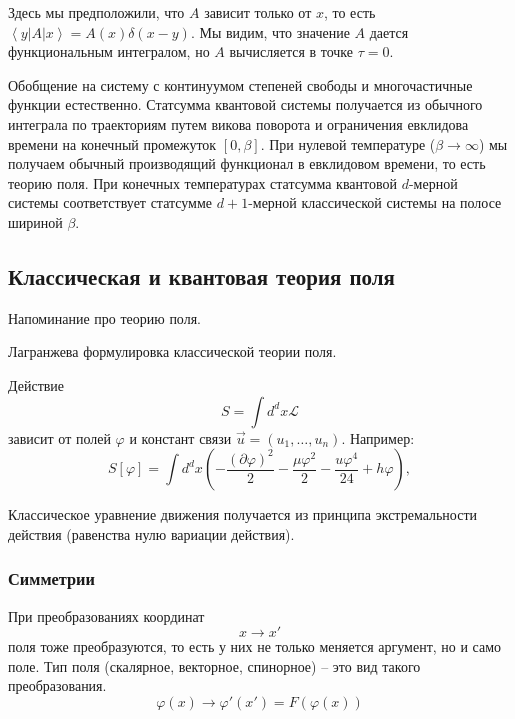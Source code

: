 \documentclass[a4paper,12pt]{article}
\theoremstyle{definition}
\theoremstyle{definition}
\theoremstyle{definition}
\begin{document}
Здесь мы предположили, что $A$ зависит только от $x$, то есть $\left<y\right|
A\left|x\right>=A(x)\delta(x-y)$. Мы видим, что значение $A$ дается функциональным интегралом, но
$A$ вычисляется в точке $\tau=0$.  

Обобщение на систему с континуумом степеней свободы и многочастичные функции естественно. Статсумма
квантовой системы получается из обычного интеграла по траекториям путем викова поворота и
ограничения евклидова времени на конечный промежуток $[0,\beta]$. При нулевой температуре ($\beta\to
\infty$) мы получаем обычный производящий функционал в евклидовом времени, то есть теорию поля. При
конечных температурах статсумма квантовой $d$-мерной системы соответствует статсумме $d+1$-мерной
классической системы на полосе шириной $\beta$. 

\subsection*{Классическая и квантовая теория поля}
\label{sec:qft}
Напоминание про теорию поля.

Лагранжева формулировка классической теории поля.

 Действие
\begin{equation}
  S=\int d^dx \mathcal{L}
\end{equation}
зависит от полей $\varphi$ и констант связи $\vec u=(u_1,\dots,u_n)$.
Например:
\begin{equation}
  S[\varphi]=\int d^d x\left( -\frac{(\partial \varphi)^2}{2}-\frac{\mu \varphi^2}{2}-\frac{u\varphi^4}{24}+h\varphi\right),
\end{equation}

Классическое уравнение движения получается из принципа экстремальности действия (равенства нулю
вариации действия). 

\subsubsection*{Симметрии}
\label{sec:symmetry}

При преобразованиях координат
\begin{equation}
  \label{eq:303}
  x\to x'
\end{equation}
поля тоже преобразуются, то есть у них не только меняется аргумент, но и само поле. Тип поля
(скалярное, векторное, спинорное) -- это вид такого преобразования. 
\begin{equation}
  \label{eq:304}
  \varphi(x)\to \varphi'(x')=F(\varphi(x))
\end{equation}
\end{document}

